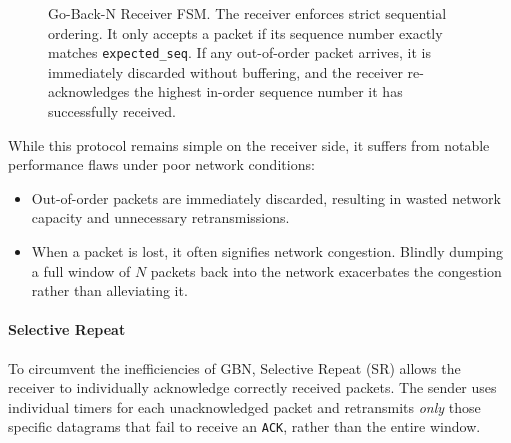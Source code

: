 \begin{figure}[htbp]
    \centering
    \caption{Go-Back-N Receiver FSM. The receiver enforces strict sequential ordering. It only accepts a packet if its sequence number exactly matches \texttt{expected\_seq}. If any out-of-order packet arrives, it is immediately discarded without buffering, and the receiver re-acknowledges the highest in-order sequence number it has successfully received.}
\end{figure}

While this protocol remains simple on the receiver side, it suffers from notable performance flaws under poor network conditions:
\begin{itemize}
    \item Out-of-order packets are immediately discarded, resulting in wasted network capacity and unnecessary retransmissions.
    \item When a packet is lost, it often signifies network congestion. Blindly dumping a full window of \( N \) packets back into the network exacerbates the congestion rather than alleviating it.
\end{itemize}

\paragraph{Selective Repeat}
To circumvent the inefficiencies of GBN, Selective Repeat (SR) allows the receiver to individually acknowledge correctly received packets. 
The sender uses individual timers for each unacknowledged packet and retransmits \emph{only} those specific datagrams that fail to receive an \texttt{ACK}, rather than the entire window.


